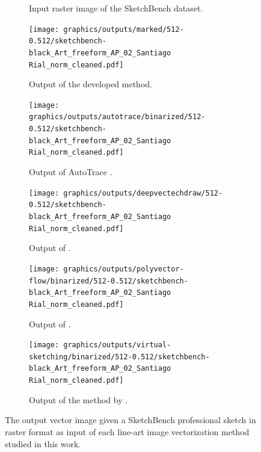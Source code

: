 \begin{figure}[h]
\begin{subfigure}{.3\textwidth}
    \caption{Input raster image of the SketchBench dataset.}
    \end{subfigure}
    \begin{subfigure}{.3\textwidth}
    \texttt{[image: graphics/outputs/marked/512-0.512/sketchbench-black\_Art\_freeform\_AP\_02\_Santiago Rial\_norm\_cleaned.pdf]}
    \caption{Output of the developed method.}
    \end{subfigure}
    \begin{subfigure}{.3\textwidth}
    \texttt{[image: graphics/outputs/autotrace/binarized/512-0.512/sketchbench-black\_Art\_freeform\_AP\_02\_Santiago Rial\_norm\_cleaned.pdf]}
    \caption{Output of AutoTrace \citep{autotrace}.}
    \end{subfigure}
    \begin{subfigure}{.3\textwidth}
    \texttt{[image: graphics/outputs/deepvectechdraw/512-0.512/sketchbench-black\_Art\_freeform\_AP\_02\_Santiago Rial\_norm\_cleaned.pdf]}
    \caption{Output of \citet{DBLP:conf/eccv/EgiazarianVAVST20}.}
    \end{subfigure}
    \begin{subfigure}{.3\textwidth}
    \texttt{[image: graphics/outputs/polyvector-flow/binarized/512-0.512/sketchbench-black\_Art\_freeform\_AP\_02\_Santiago Rial\_norm\_cleaned.pdf]}
    \caption{Output of \citet{Puhachov2021KeypointPolyvector}.}
    \end{subfigure}
    \begin{subfigure}{.3\textwidth}
    \texttt{[image: graphics/outputs/virtual-sketching/binarized/512-0.512/sketchbench-black\_Art\_freeform\_AP\_02\_Santiago Rial\_norm\_cleaned.pdf]}
    \caption{Output of the method by \citet{mo2021virtualsketching}.}
    \end{subfigure}
    \caption{The output vector image given a SketchBench professional sketch in raster format as input of each line-art image vectorization method studied in this work.}
    \label{fig:sketchbench-1.comparison}
\end{figure}

